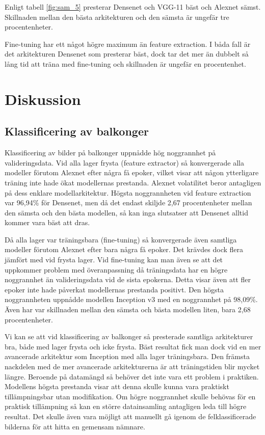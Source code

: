 \documentclass[]{kththesis}
\begin{document}
Enligt tabell \ref{fig:sam_5} presterar Densenet och VGG-11 bäst och Alexnet sämst.
Skillnaden mellan den bästa arkitekturen och den sämsta är ungefär tre procentenheter.

Fine-tuning har ett något högre maximum än feature extraction.
I båda fall är det arkitekturen Densenet som presterar bäst, dock tar det mer än dubbelt så lång tid att träna med fine-tuning och skillnaden är ungefär en procentenhet.


\chapter{Diskussion}
\section{Klassificering av balkonger}
Klassificering av bilder på balkonger uppnådde hög noggrannhet på valideringsdata. Vid alla lager frysta (feature extractor) så konvergerade alla modeller förutom Alexnet efter några få epoker, vilket visar att någon ytterligare träning inte hade ökat modellernas prestanda. Alexnet volatilitet beror antagligen på dess enklare modellarkitektur. Högsta noggrannheten vid feature extraction var 96,94\% för Densenet, men då det endast skiljde 2,67 procentenheter mellan den sämsta och den bästa modellen, så kan inga slutsatser att Densenet alltid kommer vara bäst att dras.

Då alla lager var träningsbara (fine-tuning) så konvergerade även samtliga modeller förutom Alexnet efter bara några få epoker. Det krävdes dock flera jämfört med vid frysta lager. Vid fine-tuning kan man även se att det uppkommer problem med överanpassning då träningsdata har en högre noggrannhet än valideringsdata vid de sista epokerna. Detta visar även att fler epoker inte hade påverkat modellernas prestanda positivt. Den högsta noggrannheten uppnådde modellen Inception v3 med en noggrannhet på 98,09\%. Även har var skillnaden mellan den sämsta och bästa modellen liten, bara 2,68 procentenheter.

Vi kan se att vid klassificering av balkonger så presterade samtliga arkitekturer bra, både med lager frysta och icke frysta. Bäst resultat fick man dock vid en mer avancerade arkitektur som Inception med alla lager träningsbara. Den främsta nackdelen med de mer avancerade arkitekturerna är att träningstiden blir mycket längre. Beroende på datamängd så behöver det inte vara ett problem i praktiken. Modellens högsta prestanda visar att denna skulle kunna vara praktiskt tillämpningsbar utan modifikation. Om högre noggrannhet skulle behövas för en praktisk tillämpning så kan en större datainsamling antagligen leda till högre resultat. Det skulle även vara möjligt att manuellt gå igenom de felklassificerade bilderna för att hitta en gemensam nämnare.
\end{document}
